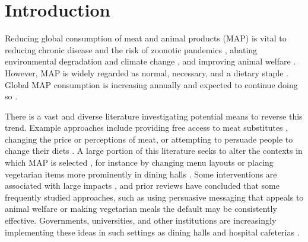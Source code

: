 \documentclass[sn-nature,referee,pdflatex]{sn-jnl}
\begin{document}
\maketitle

\section{Introduction}\label{sec1}

Reducing global consumption of meat and animal products (MAP) is vital
to reducing chronic disease and the risk of zoonotic pandemics
\citep{willett2019, landry2023, hafez2020}, abating environmental
degradation and climate change
\citep{poore2018, koneswaran2008, greger2010}, and improving animal
welfare \citep{kuruc2023, scherer2019}. However, MAP is widely regarded
as normal, necessary, and a dietary staple
\citep{piazza2022, milford2019}. Global MAP consumption is increasing
annually \citep{godfray2018} and expected to continue doing so
\citep{whitton2021}.

There is a vast and diverse literature investigating potential means to
reverse this trend. Example approaches include providing free access to
meat substitutes \citep{katare2023}, changing the price
\citep{horgen2002} or perceptions \citep{kunst2016} of meat, or
attempting to persuade people to change their diets
\citep{bianchi2018conscious}. A large portion of this literature seeks
to alter the contexts in which MAP is selected
\citep{bianchi2018restructuring}, for instance by changing menu layouts
\citep{bacon2018, gravert2021} or placing vegetarian items more
prominently in dining halls \citep{ginn2024}. Some interventions are
associated with large impacts
\citep{hansen2021, boronowsky2022, reinders2017}, and prior reviews have
concluded that some frequently studied approaches, such as using
persuasive messaging that appeals to animal welfare
\citep{mathur2021meta} or making vegetarian meals the default
\citep{meier2022} may be consistently effective. Governments,
universities, and other institutions are increasingly implementing these
ideas in such settings as dining halls \citep{pollicino2024} and
hospital cafeterias \citep{morgenstern2024}.
\end{document}
